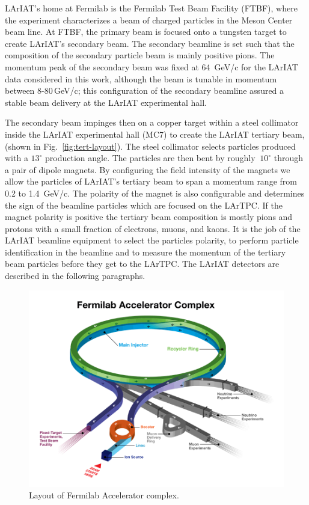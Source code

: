 LArIAT's home at Fermilab is the Fermilab Test Beam Facility (FTBF), where the experiment characterizes a beam of charged particles in the Meson Center beam line. 
At FTBF, the primary beam is focused onto a tungsten target to create LArIAT's secondary beam. The secondary beamline is set such that the composition of the secondary particle beam is mainly positive pions. The momentum peak of the secondary beam was fixed at 64~GeV/c for the LArIAT data considered in this work, although the beam is tunable in momentum between 8-80\,GeV/c; this configuration of the secondary beamline assured a stable beam delivery at the LArIAT experimental hall.
 
The secondary beam impinges then on a copper target within a steel collimator inside the LArIAT experimental hall (MC7) to create the LArIAT tertiary beam, (shown in  Fig.~\ref{fig:tert-layout}).   The steel collimator selects particles produced with a $13^\circ$ production angle.   The particles are then bent by roughly $~10^\circ$  through a pair of dipole magnets.  By configuring the field intensity of the magnets we allow the particles of LArIAT's tertiary beam to span a momentum range from 0.2 to 1.4~GeV/c. The polarity of the magnet is also configurable and determines the sign of the beamline particles which are focused on the LArTPC. If the magnet polarity is positive the tertiary beam composition is mostly pions and protons with a small fraction of electrons, muons, and kaons. It is the job of the LArIAT beamline equipment to select the particles polarity,  to perform particle identification in the beamline and to measure the momentum of the tertiary beam particles before they get to the LArTPC. The LArIAT detectors are described in the following paragraphs.  



\begin{figure}
  \centering  	
\includegraphics[width=\textwidth,height=\textheight,keepaspectratio]{Chapter-3/Images/AcceleratorFNAL.png}
\caption{Layout of Fermilab Accelerator complex.}
\label{fig:Accelerator}
\end{figure}


